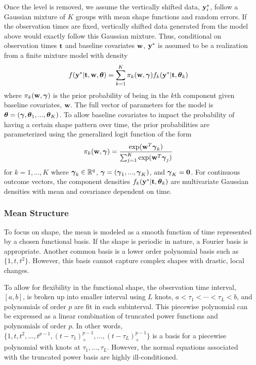 Once the level is removed, we assume the vertically shifted data, $\mathbf y_{i}^{*}$, follow a Gaussian mixture of $K$ groups with mean shape functions and random errors. If the observation times are fixed, vertically shifted data generated from the model above would exactly follow this Gaussian mixture. Thus, conditional on observation times $\mathbf t$ and baseline covariates $\mathbf w$, $\mathbf y^{*}$ is assumed to be a realization from a finite mixture model with density
\begin{align*}
 f(\mathbf y^{*}|\mathbf t,\mathbf w,\boldsymbol\theta) =  \sum^{K}_{k=1}\pi_{k}(\mathbf w,\boldsymbol \gamma)f_{k}( \mathbf y^{*}|\mathbf t,\boldsymbol\theta_{k})
\end{align*}
where $\pi_{k}(\mathbf w,\boldsymbol \gamma)$ is the prior probability of being in the $k$th component given baseline covariates, $\mathbf w$. The full vector of parameters for the model is $\boldsymbol\theta = (\boldsymbol\gamma,\boldsymbol\theta_{1},...,\boldsymbol\theta_{K})$. To allow baseline covariates to impact the probability of having a certain shape pattern over time, the prior probabilities are parameterized using the generalized logit function of the form
$$\pi_{k}(\mathbf w,\boldsymbol\gamma)=\frac{\exp(\mathbf w^{T}\boldsymbol\gamma_{k})}{\sum_{j=1}^{K}\exp(\mathbf w^{T}\boldsymbol\gamma_{j})}$$ 
for $k=1,...,K$ where $\boldsymbol \gamma_{k}\in\mathbb{R}^{q}$, $\boldsymbol\gamma = (\boldsymbol\gamma_{1},...,\boldsymbol\gamma_{K})$, and $\boldsymbol\gamma_{K}=\mathbf 0$. For continuous outcome vectors, the component densities $f_{k}(\mathbf y^{*}|\mathbf t,\boldsymbol\theta_{k})$ are multivariate Gaussian densities with mean and covariance dependent  on time.

\subsubsection{Mean Structure}
To focus on shape, the mean is modeled as a smooth function of time represented by a chosen functional basis. If the shape is periodic in nature, a Fourier basis is appropriate. Another common basis is a lower order polynomial basis such as $\{1, t, t^{2}\}$. However, this basis cannot capture complex shapes with drastic, local changes. 

To allow for flexibility in the functional shape, the observation time interval, $[a,b]$, is broken up into smaller interval using $L$ knots, $a<\tau_{1}<\cdots<\tau_{L}<b$, and polynomials of order $p$ are fit in each subinterval. This piecewise polynomial can be expressed as a linear combination of truncated power functions and polynomials of order $p$. In other words,
$\{1,t,t^{2},...,t^{p-1},(t-\tau_{1})_{+}^{p-1},...,(t-\tau_{L})_{+}^{p-1}\}$
is a basis for a piecewise polynomial with knots at $\tau_{1},...,\tau_{L}$. However, the normal equations associated with the truncated power basis are highly ill-conditioned. 

